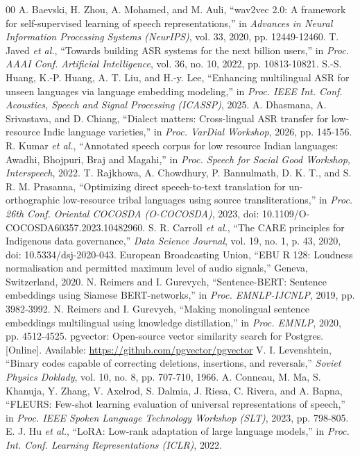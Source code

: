 \documentclass[conference]{IEEEtran}
\begin{document}
\begin{thebibliography}{00}
 A. Baevski, H. Zhou, A. Mohamed, and M. Auli, ``wav2vec 2.0: A framework for self-supervised learning of speech representations,'' in \textit{Advances in Neural Information Processing Systems (NeurIPS)}, vol. 33, 2020, pp. 12449-12460.
 T. Javed \textit{et al.}, ``Towards building ASR systems for the next billion users,'' in \textit{Proc. AAAI Conf. Artificial Intelligence}, vol. 36, no. 10, 2022, pp. 10813-10821.
 S.-S. Huang, K.-P. Huang, A. T. Liu, and H.-y. Lee, ``Enhancing multilingual ASR for unseen languages via language embedding modeling,'' in \textit{Proc. IEEE Int. Conf. Acoustics, Speech and Signal Processing (ICASSP)}, 2025.
 A. Dhasmana, A. Srivastava, and D. Chiang, ``Dialect matters: Cross-lingual ASR transfer for low-resource Indic language varieties,'' in \textit{Proc. VarDial Workshop}, 2026, pp. 145-156.
 R. Kumar \textit{et al.}, ``Annotated speech corpus for low resource Indian languages: Awadhi, Bhojpuri, Braj and Magahi,'' in \textit{Proc. Speech for Social Good Workshop, Interspeech}, 2022.
 T. Rajkhowa, A. Chowdhury, P. Bannulmath, D. K. T., and S. R. M. Prasanna, ``Optimizing direct speech-to-text translation for un-orthographic low-resource tribal languages using source transliterations,'' in \textit{Proc. 26th Conf. Oriental COCOSDA (O-COCOSDA)}, 2023, doi: 10.1109/O-COCOSDA60357.2023.10482960.
 S. R. Carroll \textit{et al.}, ``The CARE principles for Indigenous data governance,'' \textit{Data Science Journal}, vol. 19, no. 1, p. 43, 2020, doi: 10.5334/dsj-2020-043.
 European Broadcasting Union, ``EBU R 128: Loudness normalisation and permitted maximum level of audio signals,'' Geneva, Switzerland, 2020.
 N. Reimers and I. Gurevych, ``Sentence-BERT: Sentence embeddings using Siamese BERT-networks,'' in \textit{Proc. EMNLP-IJCNLP}, 2019, pp. 3982-3992.
 N. Reimers and I. Gurevych, ``Making monolingual sentence embeddings multilingual using knowledge distillation,'' in \textit{Proc. EMNLP}, 2020, pp. 4512-4525.
 pgvector: Open-source vector similarity search for Postgres. [Online]. Available: \url{https://github.com/pgvector/pgvector}
 V. I. Levenshtein, ``Binary codes capable of correcting deletions, insertions, and reversals,'' \textit{Soviet Physics Doklady}, vol. 10, no. 8, pp. 707-710, 1966.
 A. Conneau, M. Ma, S. Khanuja, Y. Zhang, V. Axelrod, S. Dalmia, J. Riesa, C. Rivera, and A. Bapna, ``FLEURS: Few-shot learning evaluation of universal representations of speech,'' in \textit{Proc. IEEE Spoken Language Technology Workshop (SLT)}, 2023, pp. 798-805.
 E. J. Hu \textit{et al.}, ``LoRA: Low-rank adaptation of large language models,'' in \textit{Proc. Int. Conf. Learning Representations (ICLR)}, 2022.
\end{thebibliography}
\end{document}
